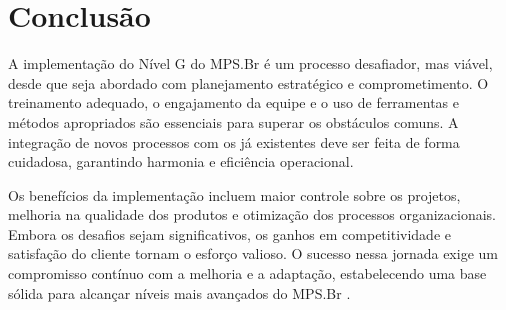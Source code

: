 \documentclass[
	12pt,				%
	oneside,			%
	a4paper,			%
	english,			%
	brazil				%
	]{abntex2unama}
\begin{document}
\chapter{Conclusão}
A implementação do Nível G do MPS.Br é um processo desafiador, mas viável, desde que seja abordado com planejamento estratégico e comprometimento. O treinamento adequado, o engajamento da equipe e o uso de ferramentas e métodos apropriados são essenciais para superar os obstáculos comuns. A integração de novos processos com os já existentes deve ser feita de forma cuidadosa, garantindo harmonia e eficiência operacional.

Os benefícios da implementação incluem maior controle sobre os projetos, melhoria na qualidade dos produtos e otimização dos processos organizacionais. Embora os desafios sejam significativos, os ganhos em competitividade e satisfação do cliente tornam o esforço valioso. O sucesso nessa jornada exige um compromisso contínuo com a melhoria e a adaptação, estabelecendo uma base sólida para alcançar níveis mais avançados do MPS.Br \cite{mpsbr_conclusion}.

\postextual



%
%

\end{document}
